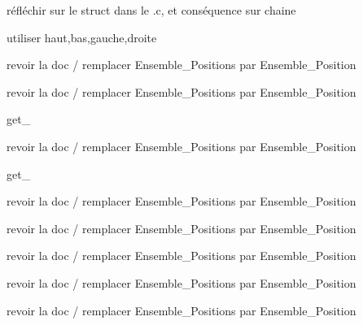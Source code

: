 
\begin{DoxyRefList}
\item[\label{todo__todo000010}%
\hypertarget{todo__todo000010}{}%
\-Membre \hyperlink{libertes_8c_ad3022110d9d089ca0e9672f8aa89bbf1}{determine\-Liberte} (\-Plateau plateau, \-Chaine chaine)]réfléchir sur le struct dans le .c, et conséquence sur chaine 

utiliser haut,bas,gauche,droite  
\item[\label{todo__todo000002}%
\hypertarget{todo__todo000002}{}%
\-Fichier \hyperlink{ensemble_8c}{ensemble.c} ]revoir la doc / remplacer \-Ensemble\-\_\-\-Positions par \-Ensemble\-\_\-\-Position  
\item[\label{todo__todo000007}%
\hypertarget{todo__todo000007}{}%
\-Fichier \hyperlink{ensemble__colores_8c}{ensemble\-\_\-colores.c} ]revoir la doc / remplacer \-Ensemble\-\_\-\-Positions par \-Ensemble\-\_\-\-Position  
\item[\label{todo__todo000004}%
\hypertarget{todo__todo000004}{}%
\-Membre \hyperlink{ensemble_8c_afe671e087f7eae69e5e89df96f2eb1c4}{ensemble\-\_\-courant} (\hyperlink{structEnsemble}{\-Ensemble} $\ast$\-E)]get\-\_\-  
\item[\label{todo__todo000008}%
\hypertarget{todo__todo000008}{}%
\-Fichier \hyperlink{ensemble__positions_8c}{ensemble\-\_\-positions.c} ]revoir la doc / remplacer \-Ensemble\-\_\-\-Positions par \-Ensemble\-\_\-\-Position  
\item[\label{todo__todo000003}%
\hypertarget{todo__todo000003}{}%
\-Membre \hyperlink{ensemble_8c_a49fbcb97f3bb110025052809e42aad2f}{ensemble\-\_\-tete} (\hyperlink{structEnsemble}{\-Ensemble} $\ast$\-E)]get\-\_\-  
\item[\label{todo__todo000009}%
\hypertarget{todo__todo000009}{}%
\-Fichier \hyperlink{libertes_8c}{libertes.c} ]revoir la doc / remplacer \-Ensemble\-\_\-\-Positions par \-Ensemble\-\_\-\-Position  
\item[\label{todo__todo000012}%
\hypertarget{todo__todo000012}{}%
\-Fichier \hyperlink{position_8c}{position.c} ]revoir la doc / remplacer \-Ensemble\-\_\-\-Positions par \-Ensemble\-\_\-\-Position  
\item[\label{todo__todo000001}%
\hypertarget{todo__todo000001}{}%
\-Fichier \hyperlink{positions_8h}{positions.h} ]revoir la doc / remplacer \-Ensemble\-\_\-\-Positions par \-Ensemble\-\_\-\-Position  
\item[\label{todo__todo000005}%
\hypertarget{todo__todo000005}{}%
\-Fichier \hyperlink{test__ensemble_8c}{test\-\_\-ensemble.c} ]revoir la doc / remplacer \-Ensemble\-\_\-\-Positions par \-Ensemble\-\_\-\-Position  
\item[\label{todo__todo000006}%
\hypertarget{todo__todo000006}{}%
\-Fichier \hyperlink{test__matrice_8c}{test\-\_\-matrice.c} ]revoir la doc / remplacer \-Ensemble\-\_\-\-Positions par \-Ensemble\-\_\-\-Position 
\end{DoxyRefList}